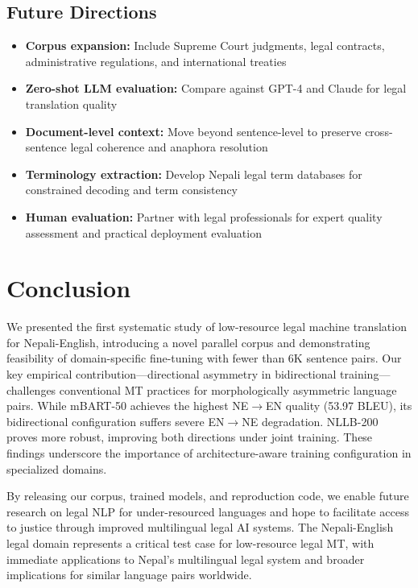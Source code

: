 \documentclass[manuscript, screen, review]{acmart}
\begin{document}
\subsection{Future Directions}
\label{subsec:future_work}

\begin{itemize}
\item \textbf{Corpus expansion:} Include Supreme Court judgments, legal contracts, administrative regulations, and international treaties

\item \textbf{Zero-shot LLM evaluation:} Compare against GPT-4 and Claude for legal translation quality

\item \textbf{Document-level context:} Move beyond sentence-level to preserve cross-sentence legal coherence and anaphora resolution

\item \textbf{Terminology extraction:} Develop Nepali legal term databases for constrained decoding and term consistency

\item \textbf{Human evaluation:} Partner with legal professionals for expert quality assessment and practical deployment evaluation
\end{itemize}

\section{Conclusion}
\label{sec:conclusion}

We presented the first systematic study of low-resource legal machine translation for Nepali-English, introducing a novel parallel corpus and demonstrating feasibility of domain-specific fine-tuning with fewer than 6K sentence pairs. Our key empirical contribution—directional asymmetry in bidirectional training—challenges conventional MT practices for morphologically asymmetric language pairs. While mBART-50 achieves the highest NE$\rightarrow$EN quality (53.97 BLEU), its bidirectional configuration suffers severe EN$\rightarrow$NE degradation. NLLB-200 proves more robust, improving both directions under joint training. These findings underscore the importance of architecture-aware training configuration in specialized domains.

By releasing our corpus, trained models, and reproduction code, we enable future research on legal NLP for under-resourced languages and hope to facilitate access to justice through improved multilingual legal AI systems. The Nepali-English legal domain represents a critical test case for low-resource legal MT, with immediate applications to Nepal's multilingual legal system and broader implications for similar language pairs worldwide.
\end{document}
